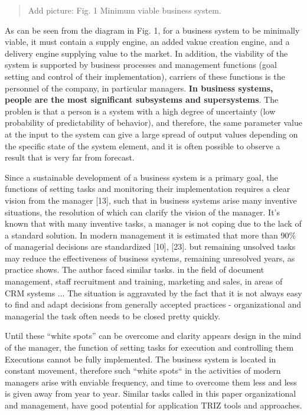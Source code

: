 \documentclass[11pt,a4paper]{book}
\newcommand{\addpicture}[1]{
  \begin{quote} Add picture: #1\end{quote}
}
\begin{document}
\addpicture{Fig. 1 Minimum viable business system.}

As can be seen from the diagram in Fig. 1, for a business system to be
minimally viable, it must contain a supply engine, an added vakue creation
engine, and a delivery engine supplying value to the market. In addition, the
viability of the system is supported by business processes and management
functions (goal setting and control of their implementation), carriers of
these functions is the personnel of the company, in particular managers.
\textbf{In business systems, people are the most significant subsystems and
  supersystems}. The problen is that a person is a system with a high degree
of uncertainty (low probability of predictability of behavior), and therefore,
the same parameter value at the input to the system can give a large spread of
output values depending on the specific state of the system element, and it is
often possible to observe a result that is very far from forecast.

Since a sustainable development of a business system is a primary goal, the
functions of setting tasks and monitoring their implementation requires a
clear vision from the manager [13], such that in business systems arise many
inventive situations, the resolution of which can clarify the vision of the
manager. It’s known that with many inventive tasks, a manager is not coping
due to the lack of a standard solution. In modern management it is estimated
that more than 90\% of managerial decisions are standardized [10], [23]. but
remaining unsolved tasks may reduce the effectiveness of business systems,
remaining unresolved years, as practice shows. The author faced similar tasks.
in the field of document management, staff recruitment and training, marketing
and sales, in areas of CRM systems ... The situation is aggravated by the fact
that it is not always easy to find and adapt decisions from generally accepted
practices - organizational and managerial the task often needs to be closed
pretty quickly.

Until these “white spots” can be overcome and clarity appears design in the
mind of the manager, the function of setting tasks for execution and
controlling them Executions cannot be fully implemented. The business system
is located in constant movement, therefore such “white spots“ in the
activities of modern managers arise with enviable frequency, and time to
overcome them less and less is given away from year to year. Similar tasks
called in this paper organizational and management, have good potential for
application TRIZ tools and approaches.
\end{document}
